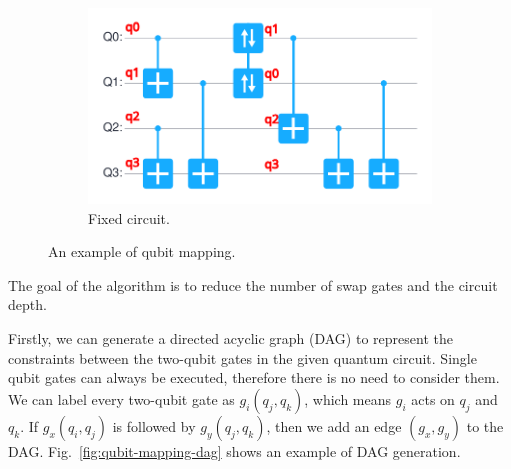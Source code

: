 \begin{figure}
	\begin{subfigure}{0.45\textwidth}
		\centering
		\includegraphics[width=\textwidth]{8.2_figures/example_updated}
		\caption{Fixed circuit.}
	\end{subfigure}
	
	\caption{An example of qubit mapping.}
	\label{fig:qubit-mapping-sample}
\end{figure}

The goal of the algorithm is to reduce the number of swap gates and the circuit depth. 

Firstly, we can generate a directed acyclic graph (DAG) to represent the constraints between the two-qubit gates in the given quantum circuit. Single qubit gates can always be executed, therefore there is no need to consider them. We can label every two-qubit gate as $g_i(q_j, q_k)$, which means $g_i$ acts on $q_j$ and $q_k$. If $g_x(q_i, q_j)$ is followed by $g_y(q_j, q_k)$, then we add an edge $(g_x, g_y)$ to the DAG. Fig.~\ref{fig:qubit-mapping-dag} shows an example of DAG generation.

